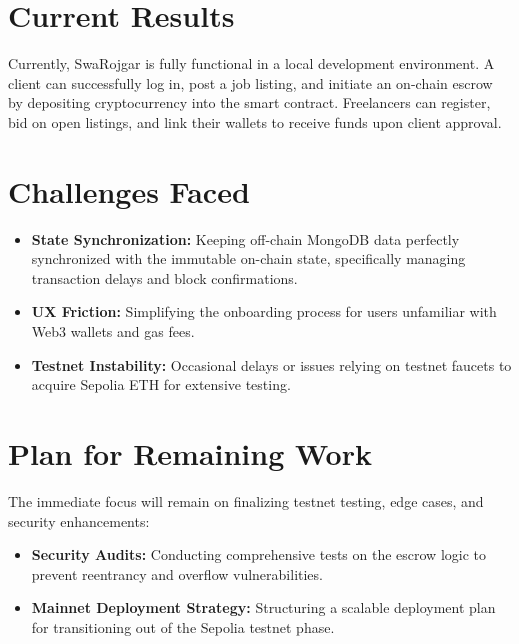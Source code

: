 \documentclass[11pt,a4paper]{article}
\begin{document}
\section{Current Results}
Currently, SwaRojgar is fully functional in a local development environment. A client can successfully log in, post a job listing, and initiate an on-chain escrow by depositing cryptocurrency into the smart contract. Freelancers can register, bid on open listings, and link their wallets to receive funds upon client approval.

\section{Challenges Faced}
\begin{itemize}[noitemsep,topsep=0pt]
    \item \textbf{State Synchronization:} Keeping off-chain MongoDB data perfectly synchronized with the immutable on-chain state, specifically managing transaction delays and block confirmations.
    \item \textbf{UX Friction:} Simplifying the onboarding process for users unfamiliar with Web3 wallets and gas fees.
    \item \textbf{Testnet Instability:} Occasional delays or issues relying on testnet faucets to acquire Sepolia ETH for extensive testing.
\end{itemize}

\section{Plan for Remaining Work}
The immediate focus will remain on finalizing testnet testing, edge cases, and security enhancements:
\begin{itemize}[noitemsep,topsep=0pt] 
    \item \textbf{Security Audits:} Conducting comprehensive tests on the escrow logic to prevent reentrancy and overflow vulnerabilities.
    \item \textbf{Mainnet Deployment Strategy:} Structuring a scalable deployment plan for transitioning out of the Sepolia testnet phase.
\end{itemize}
\end{document}
